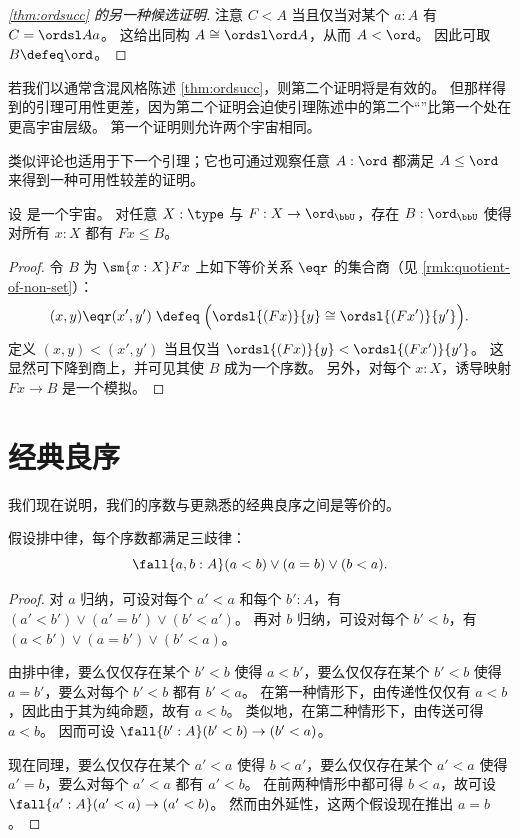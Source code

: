 \begin{proof}[\cref{thm:ordsucc} 的另一种候选证明]
  注意 $C<A$ 当且仅当对某个 $a:A$ 有 $C=\ordsl A a$。
  这给出同构 $A \cong \ordsl \ord A$，从而 $A<\ord$。
  因此可取 $B\defeq\ord$。
\end{proof}

若我们以通常含混风格陈述 \cref{thm:ordsucc}，则第二个证明将是有效的。
但那样得到的引理可用性更差，因为第二个证明会迫使引理陈述中的第二个“\ord”比第一个处在更高宇宙层级。
第一个证明则允许两个宇宙相同。

类似评论也适用于下一个引理；它也可通过观察任意 $A:\ord$ 都满足 $A\le \ord$ 来得到一种可用性较差的证明。

\begin{lem}\label{thm:ordunion}
  设 \bbU 是一个宇宙。
  对任意 $X:\type$ 与 $F:X\to \ord_\bbU$，存在 $B:\ord_\bbU$ 使得对所有 $x:X$ 都有 $Fx\le B$。
\end{lem}
\begin{proof}
  令 $B$ 为 $\sm{x:X} Fx$ 上如下等价关系 $\eqr$ 的集合商（见 \cref{rmk:quotient-of-non-set}）：
  \[ (x,y) \eqr (x',y')
  \;\defeq\;
  \Big(\ordsl{(Fx)}{y} \cong \ordsl{(Fx')}{y'}\Big).
  \]
  定义 $(x,y)<(x',y')$ 当且仅当 $\ordsl{(Fx)}{y} < \ordsl{(Fx')}{y'}$。
  这显然可下降到商上，并可见其使 $B$ 成为一个序数。
  另外，对每个 $x:X$，诱导映射 $Fx\to B$ 是一个模拟。
\end{proof}



\section{经典良序}
\label{sec:wellorderings}

%
我们现在说明，我们的序数与更熟悉的经典良序之间是等价的。

\begin{lem}
  假设排中律，每个序数都满足三歧律：
  \[ \fall{a,b:A} (a<b) \vee (a=b) \vee (b<a). \]
\end{lem}
\begin{proof}
  对 $a$ 归纳，可设对每个 $a'<a$ 和每个 $b':A$，有 $(a'<b') \vee (a'=b') \vee (b'<a')$。
  再对 $b$ 归纳，可设对每个 $b'<b$，有 $(a<b') \vee (a=b') \vee (b'<a)$。

  由排中律，要么仅仅存在某个 $b'<b$ 使得 $a<b'$，要么仅仅存在某个 $b'<b$ 使得 $a=b'$，要么对每个 $b'<b$ 都有 $b'<a$。
  在第一种情形下，由传递性仅仅有 $a<b$，因此由于其为纯命题，故有 $a<b$。
  类似地，在第二种情形下，由传送可得 $a<b$。
  因而可设 $\fall{b':A}(b'<b)\to (b'<a)$。

  现在同理，要么仅仅存在某个 $a'<a$ 使得 $b<a'$，要么仅仅存在某个 $a'<a$ 使得 $a'=b$，要么对每个 $a'<a$ 都有 $a'<b$。
  在前两种情形中都可得 $b<a$，故可设 $\fall{a':A}(a'<a)\to (a'<b)$。
  然而由外延性，这两个假设现在推出 $a=b$。
\end{proof}

